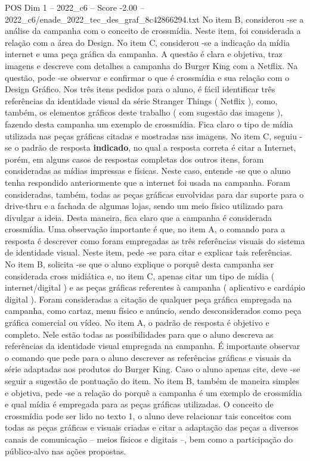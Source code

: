 \begin{textsample}{POS Dim 1 – 2022\_c6 – Score -2.00 – 2022\_c6/enade\_2022\_tec\_des\_graf\_8c42866294.txt}
No item B, considerou -se a análise da campanha com o conceito de crossmídia.
Neste item, foi considerada a relação com a área do Design.
No item C, considerou -se a indicação da mídia internet e uma peça gráfica da campanha.
A questão é clara e objetiva, traz imagens e descreve com detalhes a campanha do Burger King com a Netflix.
Na questão, pode -se observar e confirmar o que é crossmídia e sua relação com o Design Gráfico.
Nos três itens pedidos para o aluno, é fácil identificar três referências da identidade visual da série Stranger Things ( Netflix ), como, também, os elementos gráficos deste trabalho ( com sugestão das imagens ), fazendo desta campanha um exemplo de crossmídia.
Fica claro o tipo de mídia utilizada nas peças gráficas citadas e mostradas nas imagens.
No item C, seguiu -se o padrão de resposta \textbf{indicado}, no qual a resposta correta é citar a Internet, porém, em alguns casos de respostas completas dos outros itens, foram consideradas as mídias impressas e físicas.
Neste caso, entende -se que o aluno tenha respondido anteriormente que a internet foi usada na campanha.
Foram consideradas, também, todas as peças gráficas envolvidas para dar suporte para o drive-thru e a fachada de algumas lojas, sendo um meio físico utilizado para divulgar a ideia.
Desta maneira, fica claro que a campanha é considerada crossmídia.
Uma observação importante é que, no item A, o comando para a resposta é descrever como foram empregadas as três referências visuais do sistema de identidade visual.
Neste item, pede -se para citar e explicar tais referências.
No item B, solicita -se que o aluno explique o porquê desta campanha ser considerada cross midiática e, no item C, apenas citar um tipo de mídia ( internet/digital ) e as peças gráficas referentes à campanha ( aplicativo e cardápio digital ).
Foram consideradas a citação de qualquer peça gráfica empregada na campanha, como cartaz, menu físico e anúncio, sendo desconsiderados como peça gráfica comercial ou vídeo.
No item A, o padrão de resposta é objetivo e completo.
Nele estão todas as possibilidades para que o aluno descreva as referências da identidade visual empregada na campanha.
É importante observar o comando que pede para o aluno descrever as referências gráficas e visuais da série adaptadas aos produtos do Burger King.
Caso o aluno apenas cite, deve -se seguir a sugestão de pontuação do item.
No item B, também de maneira simples e objetiva, pede -se a relação do porquê a campanha é um exemplo de crossmídia e qual mídia é empregada para as peças gráficas utilizadas.
O conceito de crossmídia pode ser lido no texto 1, o aluno deve relacionar tais conceitos com todas as peças gráficas e visuais criadas e citar a adaptação das peças a diversos canais de comunicação – meios físicos e digitais –, bem como a participação do público-alvo nas ações propostas.

\end{textsample}
